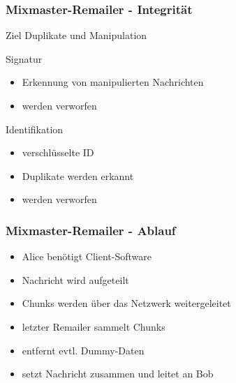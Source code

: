 \documentclass{beamer}
\begin{document}
\begin{frame}
	\frametitle{Mixmaster-Remailer - Integrität}
	\begin{exampleblock}{Ziel}
		Duplikate und Manipulation
	\end{exampleblock}

	\begin{block}{Signatur}
		\begin{itemize}	
			\item Erkennung von manipulierten Nachrichten
			\item werden verworfen
		\end{itemize}
	\end{block}

	\begin{block}{Identifikation}
		\begin{itemize}
			\item verschlüsselte ID
			\item Duplikate werden erkannt
			\item werden verworfen
		\end{itemize}
	\end{block}
\end{frame}

\begin{frame}
	\frametitle{Mixmaster-Remailer - Ablauf}
	\begin{itemize}
		\item Alice benötigt Client-Software
		\item Nachricht wird aufgeteilt
		\item Chunks werden über das Netzwerk weitergeleitet
		\item letzter Remailer sammelt Chunks
		\item entfernt evtl. Dummy-Daten
		\item setzt Nachricht zusammen und leitet an Bob	
	\end{itemize}
\end{frame}
\end{document}
